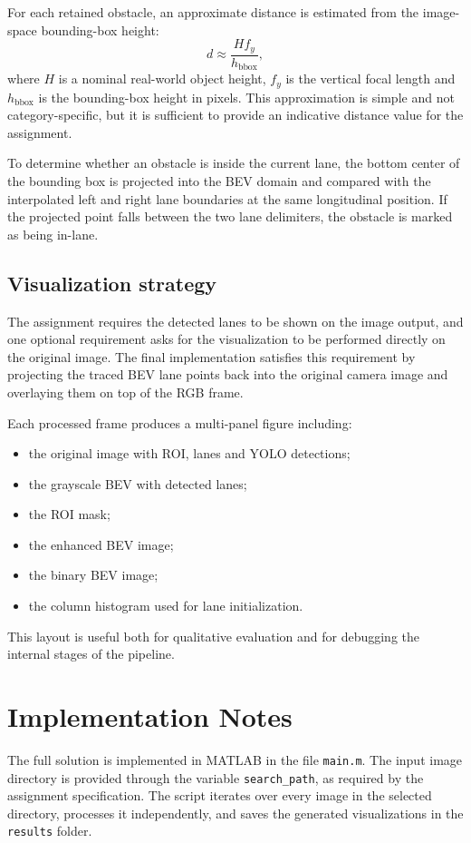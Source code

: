 \documentclass[conference]{IEEEtran}
\begin{document}
For each retained obstacle, an approximate distance is estimated from the image-space bounding-box height:
\begin{equation}
d \approx \frac{H f_y}{h_{\text{bbox}}},
\end{equation}
where $H$ is a nominal real-world object height, $f_y$ is the vertical focal length and $h_{\text{bbox}}$ is the bounding-box height in pixels. This approximation is simple and not category-specific, but it is sufficient to provide an indicative distance value for the assignment.

To determine whether an obstacle is inside the current lane, the bottom center of the bounding box is projected into the BEV domain and compared with the interpolated left and right lane boundaries at the same longitudinal position. If the projected point falls between the two lane delimiters, the obstacle is marked as being in-lane.

\subsection{Visualization strategy}
The assignment requires the detected lanes to be shown on the image output, and one optional requirement asks for the visualization to be performed directly on the original image. The final implementation satisfies this requirement by projecting the traced BEV lane points back into the original camera image and overlaying them on top of the RGB frame.

Each processed frame produces a multi-panel figure including:
\begin{itemize}
    \item the original image with ROI, lanes and YOLO detections;
    \item the grayscale BEV with detected lanes;
    \item the ROI mask;
    \item the enhanced BEV image;
    \item the binary BEV image;
    \item the column histogram used for lane initialization.
\end{itemize}

This layout is useful both for qualitative evaluation and for debugging the internal stages of the pipeline.

\section{Implementation Notes}
The full solution is implemented in MATLAB in the file \texttt{main.m}. The input image directory is provided through the variable \texttt{search\_path}, as required by the assignment specification. The script iterates over every image in the selected directory, processes it independently, and saves the generated visualizations in the \texttt{results} folder.
\end{document}
